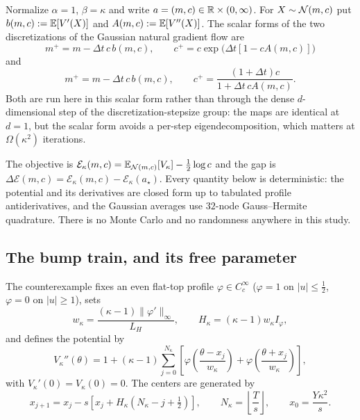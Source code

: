 \documentclass[11pt]{article}
\newcommand{\calE}{\mathcal{E}}
\newcommand{\DeltaE}{\Delta\calE}
\begin{document}
Normalize $\alpha=1$, $\beta=\kappa$ and write $a=(m,c)\in\mathbb{R}\times(0,\infty)$. For
$X\sim\mathcal{N}(m,c)$ put $b(m,c):=\mathbb{E}[V'(X)]$ and $A(m,c):=\mathbb{E}[V''(X)]$. The scalar forms
of the two discretizations of the Gaussian natural gradient flow are
\begin{equation}\label{eq:R-map}
    m^+=m-\Delta t\,c\,b(m,c),
    \qquad
    c^+=c\exp\bigl(\Delta t[1-cA(m,c)]\bigr)
\end{equation}
and
\begin{equation}\label{eq:KL-map}
    m^+=m-\Delta t\,c\,b(m,c),
    \qquad
    c^+=\frac{(1+\Delta t)c}{1+\Delta t\,cA(m,c)} .
\end{equation}
Both are run here in this scalar form rather than through the dense
$d$-dimensional step of the discretization-stepsize group: the maps are identical
at $d=1$, but the scalar form avoids a per-step eigendecomposition, which matters
at $\Omega(\kappa^2)$ iterations.

The objective is $\calE_\kappa(m,c)=\E_{\N(m,c)}[V_\kappa]-\tfrac12\log c$ and the
gap is $\DeltaE(m,c)=\calE_\kappa(m,c)-\calE_\kappa(a_\star)$. Every quantity below
is deterministic: the potential and its derivatives are closed form up to tabulated
profile antiderivatives, and the Gaussian averages use $32$-node Gauss--Hermite
quadrature. There is no Monte Carlo and no randomness anywhere in this study.

\subsection{The bump train, and its free parameter}

The counterexample fixes an even flat-top profile $\varphi\in C_c^\infty$
($\varphi=1$ on $|u|\le\tfrac12$, $\varphi=0$ on $|u|\ge1$), sets
\begin{equation}\label{eq:widths}
    w_\kappa=\frac{(\kappa-1)\|\varphi'\|_\infty}{L_H},
    \qquad
    H_\kappa=(\kappa-1)w_\kappa I_\varphi,
\end{equation}
and defines the potential by
\begin{equation}\label{eq:potential}
    V_\kappa''(\theta)=1+(\kappa-1)\sum_{j=0}^{N_\kappa}
    \left[\varphi\!\left(\frac{\theta-x_j}{w_\kappa}\right)
         +\varphi\!\left(\frac{\theta+x_j}{w_\kappa}\right)\right],
\end{equation}
with $V_\kappa'(0)=V_\kappa(0)=0$. The centers are generated by
\begin{equation}\label{eq:centers}
    x_{j+1}=x_j-s\left[x_j+H_\kappa\left(N_\kappa-j+\tfrac12\right)\right],
    \qquad
    N_\kappa=\left\lfloor\frac Ts\right\rfloor,
    \qquad
    x_0=\frac{Y\kappa^2}s .
\end{equation}
\end{document}
